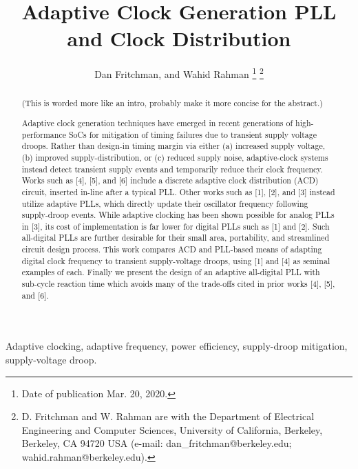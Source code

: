\documentclass{IEEEtran}
\begin{document}
\title{  Adaptive Clock Generation PLL and Clock Distribution }

\author{
	Dan Fritchman,  and Wahid Rahman 
	\thanks{Date of publication Mar. 20, 2020.}
	\thanks{
		D. Fritchman and W. Rahman are with the Department of Electrical Engineering and Computer Sciences, University of California, Berkeley, Berkeley, CA 94720 USA (e-mail: dan\_fritchman@berkeley.edu; wahid.rahman@berkeley.edu).}
}

\maketitle

\begin{abstract}

(This is worded more like an intro, probably make it more concise for the abstract.)

Adaptive clock generation techniques have emerged in recent generations of high-performance SoCs for mitigation of timing failures due to transient supply voltage droops. Rather than design-in timing margin via either (a) increased supply voltage, (b) improved supply-distribution, or (c) reduced supply noise, adaptive-clock systems instead detect transient supply events and temporarily reduce their clock frequency. Works such as [4], [5], and [6] include a discrete adaptive clock distribution (ACD) circuit, inserted in-line after a typical PLL. Other works such as [1], [2], and [3] instead utilize adaptive PLLs, which directly update their oscillator frequency following supply-droop events. While adaptive clocking has been shown possible for analog PLLs in [3], its cost of implementation is far lower for digital PLLs such as [1] and [2]. Such all-digital PLLs are further desirable for their small area, portability, and streamlined circuit design process. This work compares ACD and PLL-based means of adapting digital clock frequency to transient supply-voltage droops, using [1] and [4] as seminal examples of each. Finally we present the design of an adaptive all-digital PLL with sub-cycle reaction time which avoids many of the trade-offs cited in prior works [4], [5], and [6].
\end{abstract}

\begin{IEEEkeywords}
Adaptive clocking, adaptive frequency, power efficiency, supply-droop mitigation, supply-voltage droop.
\end{IEEEkeywords}
\end{document}
